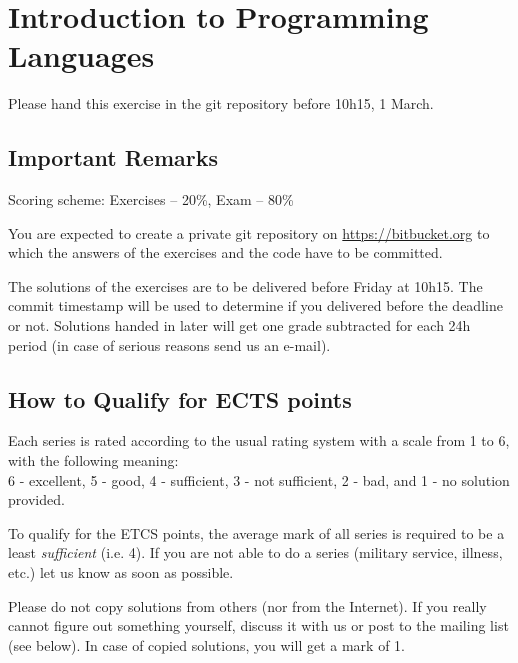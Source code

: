 \documentclass [11pt, a4wide, twoside]{article}
\begin{document}
\section*{\space{} Introduction to Programming Languages}




Please hand this exercise in the git repository before 10h15, 1 March.

\subsection*{Important Remarks}
\begin{myitemize}
\item Scoring scheme: Exercises -- 20\%, Exam -- 80\%
\item You are expected to create a private git repository on \url{https://bitbucket.org} to which the answers of the exercises and the code have to be committed. 
\item The solutions of the exercises are to be delivered before Friday at 10h15. The commit timestamp will be used to determine if you delivered before the deadline or not. Solutions handed in later will get one grade subtracted for each 24h period (in case of serious reasons send us an e-mail).
\end{myitemize}

\subsection*{How to Qualify for ECTS points}
\begin{myitemize}
\item Each series is rated according to the usual rating system with a scale from 1 to 6, with the following meaning: \\
6 - excellent, 5 - good, 4 - sufficient, 3 - not sufficient, 2 - bad, and 1 - no solution provided.
\item To qualify for the ETCS points, the average mark of all series is required to be a least \emph{sufficient} (i.e. 4). If you are not able to do a series (military service, illness, etc.) let us know as soon as possible.
\item Please do not copy solutions from others (nor from the Internet). If you really cannot figure out something yourself, discuss it with us or post to the mailing list (see below). In case of copied solutions, you will get a mark of 1.
\end{myitemize}
\end{document}
